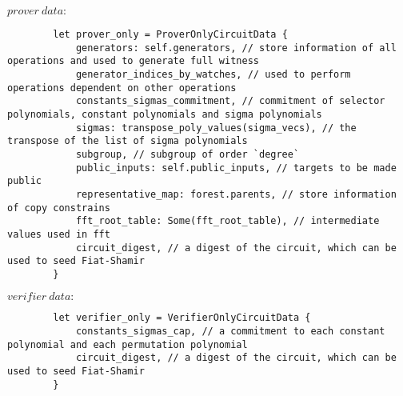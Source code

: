     $prover\ data:$

    \begin{lstlisting}
        let prover_only = ProverOnlyCircuitData {
            generators: self.generators, // store information of all operations and used to generate full witness
            generator_indices_by_watches, // used to perform operations dependent on other operations
            constants_sigmas_commitment, // commitment of selector polynomials, constant polynomials and sigma polynomials
            sigmas: transpose_poly_values(sigma_vecs), // the transpose of the list of sigma polynomials
            subgroup, // subgroup of order `degree`
            public_inputs: self.public_inputs, // targets to be made public
            representative_map: forest.parents, // store information of copy constrains
            fft_root_table: Some(fft_root_table), // intermediate values used in fft
            circuit_digest, // a digest of the circuit, which can be used to seed Fiat-Shamir
        }
    \end{lstlisting}

    $verifier\ data:$

    \begin{lstlisting}
        let verifier_only = VerifierOnlyCircuitData {
            constants_sigmas_cap, // a commitment to each constant polynomial and each permutation polynomial
            circuit_digest, // a digest of the circuit, which can be used to seed Fiat-Shamir
        }
    \end{lstlisting}